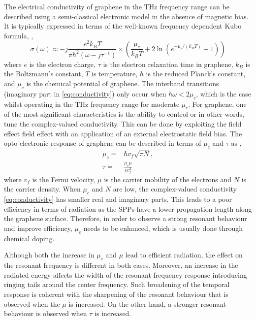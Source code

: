 \documentclass[12pt]{suhbook}
\begin{document}
The electrical conductivity of graphene in the THz frequency range can be described using a semi-classical electronic model in the absence of magnetic bias. It is typically expressed in terms of the well-known frequency dependent Kubo formula, \cite{tamagnone2012analysis},
% 
\begin{equation} 
\sigma \left( \omega \right) \approx -j \frac{{e}^{2} k_{B} T}{\pi \hbar^{2}(\omega - j \tau^{-1})}  \times\left(\frac{\mu_{c}}{k_{B} T} + 2 \ln \left(e^{-\mu_{c} /\left(k_{B} T\right)}+1\right)\right) 
\label{eq:conductivity}
\end{equation}
% 
where $e$ is the electron charge, $\tau$ is the electron relaxation time in graphene, $k_B$ is the Boltzmann’s constant, $T$ is temperature, $\hbar$ is the reduced Planck’s constant, and $\mu_c$ is the chemical potential of graphene. The interband transitions (imaginary part in \eqref{eq:conductivity}) only occur when $\hbar \omega < 2\mu_c$, which is the case whilst operating in the THz frequency range for moderate $\mu_c$. For graphene, one of the most significant characteristics is the ability to control or in other words, tune the complex-valued conductivity. This can be done by exploiting the field effect field effect with an application of an external electrostatic field bias. The opto-electronic response of graphene can be described in terms of $\mu_c$ and $\tau$ as \cite{abadal2015time},
% 
\begin{subequations}
\begin{align}
    \mu_c ={}& \hbar v_f\sqrt{\pi N},
    \label{eq:chem_pot} \\
    \tau ={}& \frac{\mu_c \mu}{e v^2_f}
    \label{eq:rel_time}
\end{align}
\label{eq:opto}
\end{subequations}
% 
where $v_f$ is the Fermi velocity, $\mu$ is the carrier mobility of the electrons and $N$ is the carrier density. When $\mu_c$ and $N$ are low,  the complex-valued conductivity \eqref{eq:conductivity} has smaller real and imaginary parts. This leads to a poor efficiency in terms of radiation as the SPPs have a lower propagation length along the graphene surface. Therefore, in order to observe a strong resonant behaviour and improve efficiency, $\mu_c$ needs to be enhanced, which is usually done through chemical doping.

Although both the increase in $\mu_c$ and $\mu$ lead to efficient radiation, the effect on the resonant frequency is different in both cases. Moreover, an increase in the radiated energy affects the width of the resonant frequency response introducing ringing tails around the center frequency. Such broadening of the temporal response is coherent with the sharpening of the resonant behaviour that is observed when the $\mu$ is increased. On the other hand, a stronger resonant behaviour is observed when $\tau$ is increased.
% 
\end{document}
